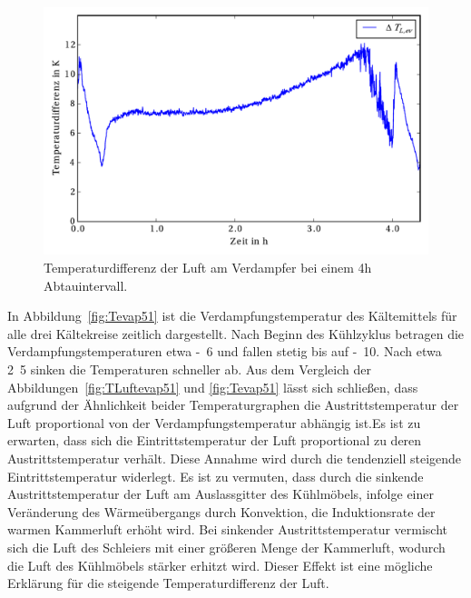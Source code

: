 \begin{figure}[h]
\centering
\includegraphics[scale=0.8]{Pictures/50/delTaT_evap1.pdf}
\caption{Temperaturdifferenz der Luft am Verdampfer bei einem 4h Abtauintervall.}
\label{fig:deltaTLuftevap50}
\end{figure}

In Abbildung~\ref{fig:Tevap51} ist die Verdampfungstemperatur des Kältemittels für alle drei Kältekreise zeitlich dargestellt. Nach Beginn des Kühlzyklus betragen die Verdampfungstemperaturen etwa \unit{-6}{\celsius} und fallen stetig bis auf \unit{-10}{\celsius}. Nach etwa \unit{2.5}{\hour} sinken die Temperaturen schneller ab. Aus dem Vergleich der Abbildungen~\ref{fig:TLuftevap51} und \ref{fig:Tevap51} lässt sich schließen, dass aufgrund der Ähnlichkeit beider Temperaturgraphen die Austrittstemperatur der Luft proportional von der Verdampfungstemperatur abhängig ist.\newline Es ist zu erwarten, dass sich die Eintrittstemperatur der Luft proportional zu deren Austrittstemperatur verhält. Diese Annahme wird durch die tendenziell steigende Eintrittstemperatur widerlegt. Es ist zu vermuten, dass durch die sinkende Austrittstemperatur der Luft am Auslassgitter des Kühlmöbels, infolge einer Veränderung des Wärmeübergangs durch Konvektion, die Induktionsrate der warmen Kammerluft erhöht wird. Bei sinkender Austrittstemperatur vermischt sich die Luft des Schleiers mit einer größeren Menge der Kammerluft, wodurch die Luft des Kühlmöbels stärker erhitzt wird.
Dieser Effekt ist eine mögliche Erklärung für die steigende Temperaturdifferenz der Luft.

